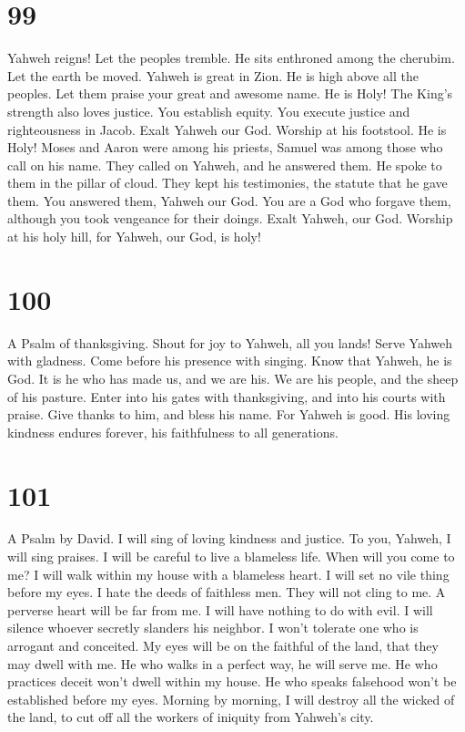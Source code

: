 \hypertarget{section-89}{%
\section{99}\label{section-89}}

 Yahweh reigns! Let the peoples tremble. He sits enthroned
among the cherubim. Let the earth be moved.  Yahweh is great
in Zion. He is high above all the peoples.  Let them praise
your great and awesome name. He is Holy!  The King's
strength also loves justice. You establish equity. You execute justice
and righteousness in Jacob.  Exalt Yahweh our God. Worship
at his footstool. He is Holy!  Moses and Aaron were among
his priests, Samuel was among those who call on his name. They called on
Yahweh, and he answered them.  He spoke to them in the
pillar of cloud. They kept his testimonies, the statute that he gave
them.  You answered them, Yahweh our God. You are a God who
forgave them, although you took vengeance for their doings. 
Exalt Yahweh, our God. Worship at his holy hill, for Yahweh, our God, is
holy!

\hypertarget{section-90}{%
\section{100}\label{section-90}}

A Psalm of thanksgiving.  Shout for joy to Yahweh, all you
lands!  Serve Yahweh with gladness. Come before his presence
with singing.  Know that Yahweh, he is God. It is he who has
made us, and we are his. We are his people, and the sheep of his
pasture.  Enter into his gates with thanksgiving, and into
his courts with praise. Give thanks to him, and bless his name.
 For Yahweh is good. His loving kindness endures forever,
his faithfulness to all generations.

\hypertarget{section-91}{%
\section{101}\label{section-91}}

A Psalm by David.  I will sing of loving kindness and
justice. To you, Yahweh, I will sing praises.  I will be
careful to live a blameless life. When will you come to me? I will walk
within my house with a blameless heart.  I will set no vile
thing before my eyes. I hate the deeds of faithless men. They will not
cling to me.  A perverse heart will be far from me. I will
have nothing to do with evil.  I will silence whoever
secretly slanders his neighbor. I won't tolerate one who is arrogant and
conceited.  My eyes will be on the faithful of the land,
that they may dwell with me. He who walks in a perfect way, he will
serve me.  He who practices deceit won't dwell within my
house. He who speaks falsehood won't be established before my eyes.
 Morning by morning, I will destroy all the wicked of the
land, to cut off all the workers of iniquity from Yahweh's city.

